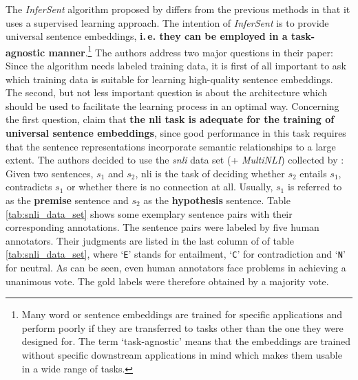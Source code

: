 The \textit{InferSent} algorithm proposed by \citep{Conneau.2017} differs from the previous methods in that it uses a supervised learning approach. The intention of \textit{InferSent} is to provide universal sentence embeddings, \textbf{i.\,e. they can be employed in a task-agnostic manner}.\footnote{Many word or sentence embeddings are trained for specific applications and perform poorly if they are transferred to tasks other than the one they were designed for. The term `task-agnostic' means that the embeddings are trained without specific downstream applications in mind which makes them usable in a wide range of tasks.} The authors address two major questions in their paper: Since the algorithm needs labeled training data, it is first of all important to ask which training data is suitable for learning high-quality sentence embeddings. The second, but not less important question is about the architecture which should be used to facilitate the learning process in an optimal way. Concerning the first question, \citep{Conneau.2017} claim that \textbf{the \gls{nli} task is adequate for the training of universal sentence embeddings}, since good performance in this task requires that the sentence representations incorporate semantic relationships to a large extent. The authors decided to use the \textit{\gls{snli}} data set (+ \textit{MultiNLI}) collected by \citep{Bowman.2015}: Given two sentences, $s_1$ and $s_2$, \gls{nli} is the task of deciding whether $s_2$ entails $s_1$, contradicts $s_1$ or whether there is no connection at all. Usually, $s_1$ is referred to as the \textbf{premise} sentence and $s_2$ as the \textbf{hypothesis} sentence. Table \vref{tab:snli_data_set} shows some exemplary sentence pairs with their corresponding annotations. The sentence pairs were labeled by five human annotators. Their judgments are listed in the last column of of table \vref{tab:snli_data_set}, where `\texttt{E}' stands for entailment, `\texttt{C}' for contradiction and `\texttt{N}' for neutral. As can be seen, even human annotators face problems in achieving a unanimous vote. The gold labels were therefore obtained by a majority vote.

\vspace*{3mm}

\vspace*{3mm}

